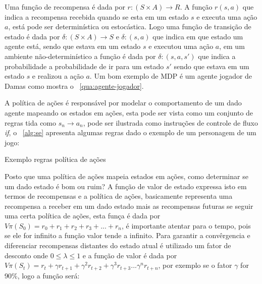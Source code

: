 Uma função de recompensa é dada por  $r: (S \times A) \rightarrow R$. A função $r(s,a)$ que indica a recompensa 
recebida quando se esta em um estado $s$ e executa uma ação $a$, está pode ser determinística ou estocástica. Logo uma 
função de transição de estado é dada por $\delta:(S \times A) \rightarrow S $ e $\delta:(s,a)$ que indica em que 
estado um agente está, sendo que estava em um estado $s$ e executou uma ação $a$, em um ambiente não-determinístico
a função é dada por $\delta:(s,a,s')$ que indica a probabilidade a probabilidade de ir para um estado $s'$ sendo que
estava em um estado $s$ e realizou a ação $a$.
Um bom exemplo de MDP é um agente jogador de Damas como mostra o ~\autoref{qua:agente-jogador}.

\begin{quadro}[h!]	
	\centering
\end{quadro}  

A política de ações é responsável por modelar o comportamento de um dado agente mapeando os estados em ações, esta pode 
ser vista como um conjunto de regras tida como $s_{n} \rightarrow a_{n}$, pode ser ilustrada como instruções de controle 
de fluxo \textit{if}, o ~\autoref{alg:se} apresenta algumas regras dado o exemplo de um personagem de um jogo:
\begin{algorithm}[h!]
	\SetSpacedAlgorithm
	\caption{\label{alg:se}Exemplo regras política de ações}
\end{algorithm}   

Posto que uma política de ações mapeia estados em ações, como determinar se um dado estado é bom ou ruim?
A função de valor de estado expressa isto em termos de recompensas e a política de ações, basicamente representa
uma recompensa a receber em um dado estado mais as recompensas futuras se seguir uma certa política de ações, esta
funça é dada por $V\pi(S_{0})= r_{0}+r_{1}+r_{2}+r_{3}+ ... + r_{n}$, é importante atentar para o tempo, pois 
se ele for infinito a função valor tende a infinito. Para garantir a convêrgencia e diferenciar recompensas distantes do
estado atual é utilizado um fator de desconto onde $0 \leqslant \lambda \leqslant 1$  e a função de valor é dada por
$V\pi(S_{t})= r_{t} + \gamma r_{t+1} + \gamma^{2} r_{t+2} + \gamma^{3} r_{t+3} ... \gamma^{n} r_{t+n}$, por exemplo
se o fator $\gamma$ for 90\%, logo a função será:

